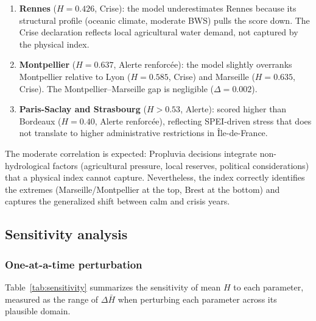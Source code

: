 \documentclass[11pt,a4paper]{article}
\begin{document}
\begin{enumerate}
  \item \textbf{Rennes} ($H = 0.426$, Crise): the model underestimates Rennes because its structural profile (oceanic climate, moderate BWS) pulls the score down. The Crise declaration reflects local agricultural water demand, not captured by the physical index.
  \item \textbf{Montpellier} ($H = 0.637$, Alerte renforcée): the model slightly overranks Montpellier relative to Lyon ($H = 0.585$, Crise) and Marseille ($H = 0.635$, Crise). The Montpellier--Marseille gap is negligible ($\Delta = 0.002$).
  \item \textbf{Paris-Saclay and Strasbourg} ($H > 0.53$, Alerte): scored higher than Bordeaux ($H = 0.40$, Alerte renforcée), reflecting SPEI-driven stress that does not translate to higher administrative restrictions in Île-de-France.
\end{enumerate}

The moderate correlation is expected: Propluvia decisions integrate non-hydrological factors (agricultural pressure, local reserves, political considerations) that a physical index cannot capture. Nevertheless, the index correctly identifies the extremes (Marseille/Montpellier at the top, Brest at the bottom) and captures the generalized shift between calm and crisis years.

\subsection{Sensitivity analysis}

\subsubsection{One-at-a-time perturbation}

Table~\ref{tab:sensitivity} summarizes the sensitivity of mean $H$ to each parameter, measured as the range of $\Delta \bar{H}$ when perturbing each parameter across its plausible domain.
\end{document}
